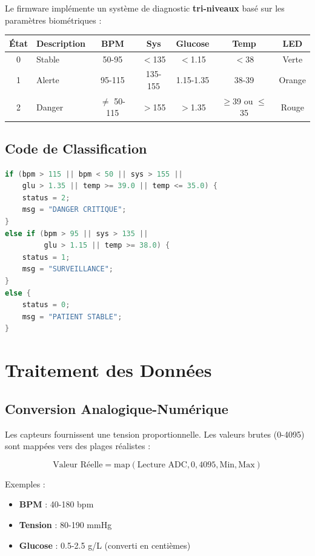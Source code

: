 \documentclass[12pt,french]{report}
\begin{document}
Le firmware implémente un système de diagnostic \textbf{tri-niveaux} basé sur les paramètres biométriques :

\begin{table}[h]
\centering
\begin{tabular}{|c|l|c|c|c|c|c|}
\hline
\textbf{État} & \textbf{Description} & \textbf{BPM} & \textbf{Sys} & \textbf{Glucose} & \textbf{Temp} & \textbf{LED} \\
\hline
0 & Stable & 50-95 & $<$135 & $<$1.15 & $<$38 & Verte \\
\hline
1 & Alerte & 95-115 & 135-155 & 1.15-1.35 & 38-39 & Orange \\
\hline
2 & Danger & $\neq$ 50-115 & $>$155 & $>$1.35 & $\geq$39 ou $\leq$35 & Rouge \\
\hline
\end{tabular}
\end{table}

\subsection{Code de Classification}

\begin{lstlisting}[language=C++, caption=Logique de diagnostic (main.cpp)]
if (bpm > 115 || bpm < 50 || sys > 155 || 
    glu > 1.35 || temp >= 39.0 || temp <= 35.0) {
    status = 2;
    msg = "DANGER CRITIQUE";
} 
else if (bpm > 95 || sys > 135 || 
         glu > 1.15 || temp >= 38.0) {
    status = 1;
    msg = "SURVEILLANCE";
}
else {
    status = 0;
    msg = "PATIENT STABLE";
}
\end{lstlisting}

\section{Traitement des Données}

\subsection{Conversion Analogique-Numérique}

Les capteurs fournissent une tension proportionnelle. Les valeurs brutes (0-4095) sont mappées vers des plages réalistes :

\begin{equation}
\text{Valeur Réelle} = \text{map}(\text{Lecture ADC}, 0, 4095, \text{Min}, \text{Max})
\end{equation}

Exemples :
\begin{itemize}
    \item \textbf{BPM} : 40-180 bpm
    \item \textbf{Tension} : 80-190 mmHg
    \item \textbf{Glucose} : 0.5-2.5 g/L (converti en centièmes)
\end{itemize}
\end{document}
